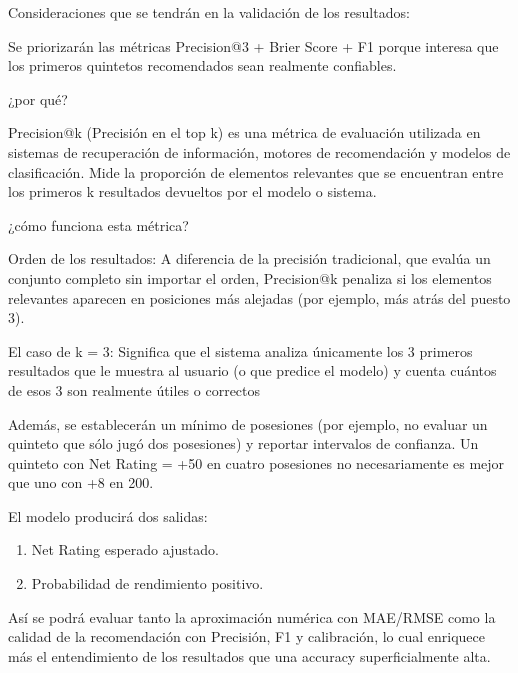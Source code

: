 Consideraciones que se tendrán en la validación de los resultados:

Se priorizarán las métricas Precision@3 + Brier Score + F1 porque interesa que los primeros quintetos recomendados sean realmente confiables.

¿por qué?

Precision@k (Precisión en el top k) es una métrica de evaluación utilizada en sistemas de recuperación de información, motores de recomendación y modelos de clasificación. Mide la proporción de elementos relevantes que se encuentran entre los primeros k resultados devueltos por el modelo o sistema.

¿cómo funciona esta métrica?

Orden de los resultados: A diferencia de la precisión tradicional, que evalúa un conjunto completo sin importar el orden, Precision@k penaliza si los elementos relevantes aparecen en posiciones más alejadas (por ejemplo, más atrás del puesto 3).

El caso de k = 3: Significa que el sistema analiza únicamente los 3 primeros resultados que le muestra al usuario (o que predice el modelo) y cuenta cuántos de esos 3 son realmente útiles o correctos

Además, se establecerán un mínimo de posesiones (por ejemplo, no evaluar un quinteto que sólo jugó dos posesiones) y reportar intervalos de confianza. Un quinteto con Net Rating = +50 en cuatro posesiones no necesariamente es mejor que uno con +8 en 200.

El modelo producirá dos salidas:
\begin{enumerate}
\item Net Rating esperado ajustado.
\item Probabilidad de rendimiento positivo.
\end{enumerate}

Así se podrá evaluar tanto la aproximación numérica con MAE/RMSE como la calidad de la recomendación con Precisión, F1 y calibración, lo cual enriquece más el entendimiento de los resultados que una accuracy superficialmente alta.
